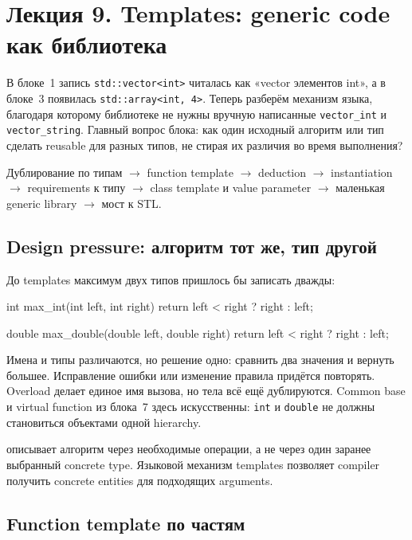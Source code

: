 \section{Лекция 9. Templates: generic code как библиотека}
\label{sec:lecture-09}

В блоке~1 запись \texttt{std::vector<int>} читалась как «vector элементов
int», а в блоке~3 появилась \texttt{std::array<int, 4>}. Теперь разберём
механизм языка, благодаря которому библиотеке не нужны вручную написанные
\texttt{vector\_int} и \texttt{vector\_string}. Главный вопрос блока:
как один исходный алгоритм или тип сделать reusable для разных типов, не
стирая их различия во время выполнения?

\begin{importantbox}
Дублирование по типам $\rightarrow$ function template $\rightarrow$
deduction $\rightarrow$ instantiation $\rightarrow$ requirements к типу
$\rightarrow$ class template и value parameter $\rightarrow$ маленькая
generic library $\rightarrow$ мост к STL.
\end{importantbox}

\subsection{Design pressure: алгоритм тот же, тип другой}

До templates максимум двух типов пришлось бы записать дважды:

\begin{cppcode}
int max_int(int left, int right) {
    return left < right ? right : left;
}

double max_double(double left, double right) {
    return left < right ? right : left;
}
\end{cppcode}

Имена и типы различаются, но решение одно: сравнить два значения и вернуть
большее. Исправление ошибки или изменение правила придётся повторять. Overload
делает единое имя вызова, но тела всё ещё дублируются. Common base и virtual
function из блока~7 здесь искусственны: \texttt{int} и \texttt{double} не
должны становиться объектами одной hierarchy.

 описывает алгоритм через необходимые операции, а
не через один заранее выбранный concrete type. Языковой механизм templates
позволяет compiler получить concrete entities для подходящих arguments.

\subsection{Function template по частям}

